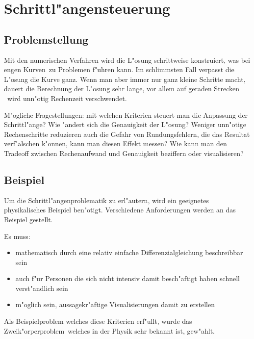 \chapter{Schrittl"angensteuerung\label{chapter:thema}}
\begin{refsection}
\printbibliography[heading=subbibliography]

\section{Problemstellung}

Mit den numerischen Verfahren wird die L"osung schrittweise konstruiert, was bei \glqq engen Kurven\grqq~zu Problemen f"uhren kann.
Im schlimmsten Fall verpasst die L"osung die Kurve ganz.
Wenn man aber immer nur ganz kleine Schritte macht, dauert die Berechnung der L"osung sehr lange, vor allem auf \glqq geraden Strecken \grqq~wird unn"otig Rechenzeit verschwendet.

M"ogliche Fragestellungen: mit welchen Kriterien steuert man die Anpassung der Schrittl"ange?
Wie "andert sich die Genauigkeit der L"osung?
Weniger unn"otige Rechenschritte reduzieren auch die Gefahr von Rundungsfehlern, die das Resultat verf"alschen k"onnen, kann man diesen Effekt messen?
Wie kann man den Tradeoff zwischen Rechenaufwand und Genauigkeit beziffern oder visualisieren?


\section{Beispiel}

Um die Schrittl"angenproblematik zu erl"autern, wird ein geeignetes physikalisches Beispiel ben"otigt.
Verschiedene Anforderungen werden an das Beispiel gestellt.

Es muss: 

\begin{itemize}
\item mathematisch durch eine relativ einfache Differenzialgleichung beschreibbar sein
\item auch f"ur Personen die sich nicht intensiv damit besch"aftigt haben schnell verst"andlich sein
\item m"oglich sein, aussagekr"aftige Visualisierungen damit zu erstellen
\end{itemize}

Als Beispielproblem welches diese Kriterien erf"ullt, wurde das \glqq Zweik"orperproblem\grqq~welches in der Physik sehr bekannt ist, gew"ahlt.


\end{refsection}
